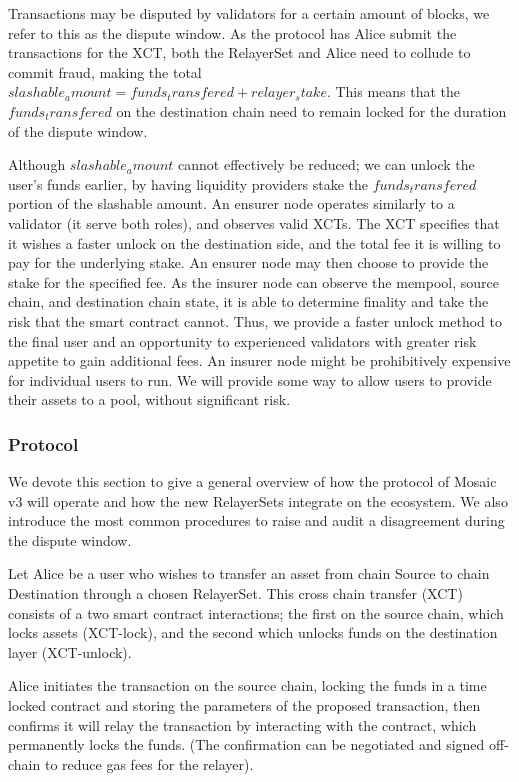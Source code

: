 Transactions may be disputed by validators for a certain amount of blocks, we refer to this as the dispute window. As the protocol has Alice submit the transactions for the XCT, both the RelayerSet and Alice need to collude to commit fraud, making the total $slashable_amount = funds_transfered + relayer_stake$. This means that the $funds_transfered$ on the destination chain need to remain locked for the duration of the dispute window.

Although $slashable_amount$ cannot effectively be reduced; we can unlock the user’s funds earlier, by having liquidity providers stake the $funds_transfered$ portion of the slashable amount. An ensurer node operates similarly to a validator (it serve both roles), and observes valid XCTs. The XCT specifies that it wishes a faster unlock on the destination side, and the total fee it is willing to pay for the underlying stake. An ensurer node may then choose to provide the stake for the specified fee. As the insurer node can observe the mempool, source chain, and destination chain state, it is able to determine finality and take the risk that the smart contract cannot. Thus, we provide a faster unlock method to the final user and an opportunity to experienced validators with greater risk appetite to gain additional fees.  An insurer node might be prohibitively expensive for individual users to run. We will provide some way to allow users to provide their assets to a pool, without significant risk.

\subsubsection{Protocol}
We devote this section to give a general overview of how the protocol of Mosaic v3 will operate and how the new RelayerSets integrate on the ecosystem. We also introduce the most common procedures to raise and audit a disagreement during the dispute window.

Let Alice be a user who wishes to transfer an asset from chain Source to chain Destination through a chosen RelayerSet. This cross chain transfer (XCT) consists of a two smart contract interactions; the first on the source chain, which locks assets (XCT-lock), and the second which unlocks funds on the destination layer (XCT-unlock).

Alice initiates the transaction on the source chain, locking the funds in a time locked contract and storing the parameters of the proposed transaction,  then confirms it will relay the transaction by interacting with the contract, which permanently locks the funds. (The confirmation can be negotiated and signed off-chain to reduce gas fees for the relayer).

